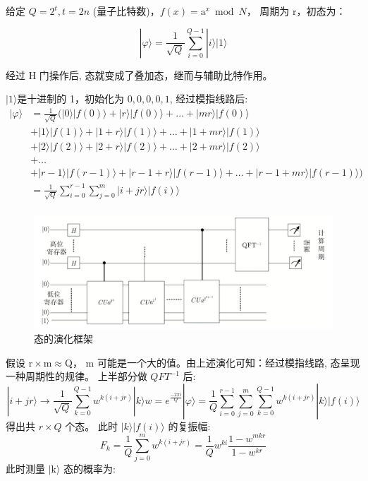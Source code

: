 \documentclass[12pt,hyperref,a4paper,UTF8]{ctexart}
\begin{document}
给定 $Q=2^t, t=2 n$ (量子比特数)，$f(x)=\mathrm{a}^x \bmod N$， 周期为 $\mathrm{r}$，初态为：

$$|\varphi\rangle=\frac{1}{\sqrt{Q}} \sum_{i=0}^{Q-1}|i\rangle|1\rangle$$

经过 $\mathrm{H}$ 门操作后, 态就变成了叠加态，继而与辅助比特作用。

$|1\rangle$是十进制的 1，初始化为 $0,0,0,0,1$, 经过模指线路后:
$$
\begin{aligned}
|\varphi\rangle&=\frac{1}{\sqrt{Q}}(|0\rangle|f(0)\rangle+|r\rangle|f(0)\rangle+\ldots+|m r\rangle|f(0)\rangle \\
&+|1\rangle|f(1)\rangle+|1+r\rangle|f(1)\rangle+\ldots+|1+m r\rangle|f(1)\rangle \\
&+|2\rangle|f(2)\rangle+|2+r\rangle|f(2)\rangle+\ldots+|2+m r\rangle|f(2)\rangle \\
&+\ldots\\
&+|r-1\rangle|f(r-1)\rangle+|r-1+r\rangle|f(r-1)\rangle+\ldots+|r-1+m r\rangle|f(r-1)\rangle) \\
&=\frac{1}{\sqrt{Q}} \sum_{i=0}^{r-1} \sum_{j=0}^m|i+j r\rangle|f(i)\rangle\\
\end{aligned}
$$
\begin{figure}[!htbp]     
    \centering     
    \includegraphics[width =0.8 \textwidth]{figures/态的演化框架图.png}     
    \caption{态的演化框架}
\end{figure}

\newpage
假设 $\mathrm{r} \times \mathrm{m} \approx \mathrm{Q}$， $\mathrm{m}$ 可能是一个大的值。由上述演化可知：经过模指线路, 态呈现一种周期性的规律。
上半部分做 $Q F T^{-1}$ 后:
$$
|i+j r\rangle \rightarrow \frac{1}{\sqrt{Q}} \sum_{k=0}^{Q-1} w^{k(i+j r)}|k\rangle w=e^{\frac{-2 \pi i}{Q}}|\varphi\rangle=\frac{1}{Q} \sum_{i=0}^{r-1} \sum_{j=0}^m \sum_{k=0}^{Q-1} w^{k(i+j r)}|k\rangle|f(i)\rangle
$$
得出共 $r \times Q$ 个态。
此时 $|k\rangle|f(i)\rangle$ 的复振幅:
$$
F_k=\frac{1}{Q} \sum_{j=0}^m w^{k(i+j r)}=\frac{1}{Q} w^{k i} \frac{1-w^{m k r}}{1-w^{k r}}
$$
此时测量 $|\mathrm{k}\rangle$ 态的概率为:
\end{document}
